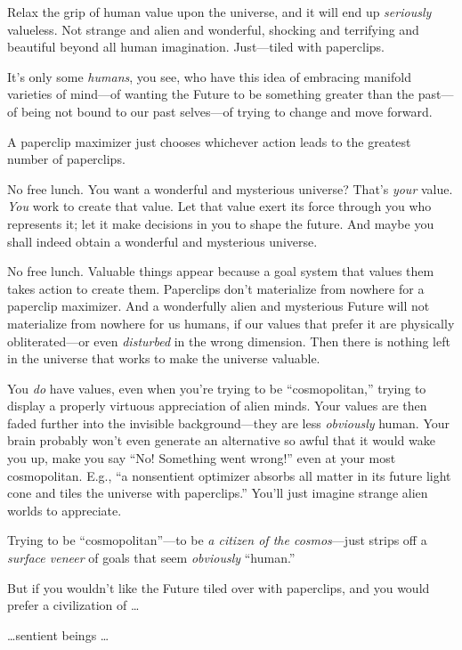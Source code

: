 {
 Relax the grip of human value upon the universe, and it will end
up \textit{seriously} valueless. Not strange and alien and wonderful,
shocking and terrifying and beautiful beyond all human imagination.
Just---tiled with paperclips.}

{
 It's only some \textit{humans}, you see, who have
this idea of embracing manifold varieties of mind---of wanting the
Future to be something greater than the past---of being not bound to
our past selves---of trying to change and move forward.}

{
 A paperclip maximizer just chooses whichever action leads to the
greatest number of paperclips.}

{
 No free lunch. You want a wonderful and mysterious universe?
That's \textit{your} value. \textit{You} work to create
that value. Let that value exert its force through you who represents
it; let it make decisions in you to shape the future. And maybe you
shall indeed obtain a wonderful and mysterious universe.}

{
 No free lunch. Valuable things appear because a goal system that
values them takes action to create them. Paperclips
don't materialize from nowhere for a paperclip
maximizer. And a wonderfully alien and mysterious Future will not
materialize from nowhere for us humans, if our values that prefer it
are physically obliterated---or even \textit{disturbed} in the wrong
dimension. Then there is nothing left in the universe that works to
make the universe valuable.}

{
 You \textit{do} have values, even when you're
trying to be ``cosmopolitan,''
trying to display a properly virtuous appreciation of alien minds. Your
values are then faded further into the invisible background{}---they
are less \textit{obviously} human. Your brain probably
won't even generate an alternative so awful that it
would wake you up, make you say ``No! Something went
wrong!'' even at your most cosmopolitan. E.g.,
``a nonsentient optimizer absorbs all matter in its
future light cone and tiles the universe with
paperclips.'' You'll just imagine
strange alien worlds to appreciate.}

{
 Trying to be
``cosmopolitan''---to be \textit{a
citizen of the cosmos}{}---just strips off a \textit{surface veneer} of
goals that seem \textit{obviously}
``human.''}

{
 But if you wouldn't like the Future tiled over
with paperclips, and you would prefer a civilization of \ldots}

{
 \ldots sentient beings \ldots}


